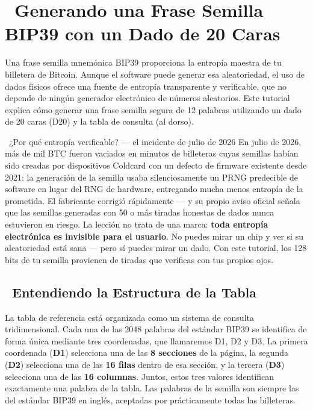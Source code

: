 \documentclass[10pt]{article}
\begin{document}
\section*{\faBitcoin~Generando una Frase Semilla BIP39 con un Dado de 20 Caras}

\footnotesize

Una frase semilla mnemónica BIP39 proporciona la entropía maestra de tu billetera de Bitcoin. Aunque el software puede generar esa aleatoriedad, el uso de dados físicos ofrece una fuente de entropía transparente y verificable, que no depende de ningún generador electrónico de números aleatorios. Este tutorial explica cómo generar una frase semilla segura de 12 palabras utilizando un dado de 20 caras (D20) y la tabla de consulta (al dorso).

\begin{contextbox}{\faNewspaper~¿Por qué entropía verificable? --- el incidente de julio de 2026}
En julio de 2026, más de mil BTC fueron vaciados en minutos de billeteras cuyas semillas habían sido creadas por dispositivos Coldcard con un defecto de firmware existente desde 2021: la generación de la semilla usaba silenciosamente un PRNG predecible de software en lugar del RNG de hardware, entregando mucha menos entropía de la prometida. El fabricante corrigió rápidamente --- y su propio aviso oficial señala que las semillas generadas con 50 o más tiradas honestas de dados nunca estuvieron en riesgo. La lección no trata de una marca: \textbf{toda entropía electrónica es invisible para el usuario}. No puedes mirar un chip y ver si su aleatoriedad está sana --- pero sí puedes mirar un dado. Con este tutorial, los 128 bits de tu semilla provienen de tiradas que verificas con tus propios ojos.
\end{contextbox}

\subsection*{\faTable~Entendiendo la Estructura de la Tabla}

La tabla de referencia está organizada como un sistema de consulta tridimensional. Cada una de las 2048 palabras del estándar BIP39 se identifica de forma única mediante tres coordenadas, que llamaremos D1, D2 y D3. La primera coordenada (\textbf{D1}) selecciona una de las \textbf{8 secciones} de la página, la segunda (\textbf{D2}) selecciona una de las \textbf{16 filas} dentro de esa sección, y la tercera (\textbf{D3}) selecciona una de las \textbf{16 columnas}. Juntos, estos tres valores identifican exactamente una palabra de la tabla. Las palabras de la semilla son siempre las del estándar BIP39 en inglés, aceptadas por prácticamente todas las billeteras.
\end{document}
